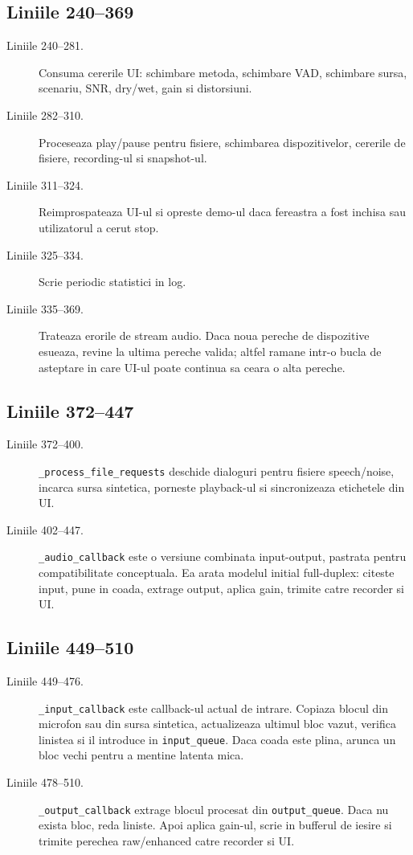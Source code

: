 \documentclass[12pt,a4paper]{report}
\newcommand{\chunk}[3]{\subsection*{Liniile #2--#3}}
\begin{document}
\chunk{../src/tools/realtime/engine.py}{240}{369}

\begin{description}
    \item[Liniile 240--281.] Consuma cererile UI: schimbare metoda, schimbare VAD,
    schimbare sursa, scenariu, SNR, dry/wet, gain si distorsiuni.
    \item[Liniile 282--310.] Proceseaza play/pause pentru fisiere, schimbarea
    dispozitivelor, cererile de fisiere, recording-ul si snapshot-ul.
    \item[Liniile 311--324.] Reimprospateaza UI-ul si opreste demo-ul daca fereastra
    a fost inchisa sau utilizatorul a cerut stop.
    \item[Liniile 325--334.] Scrie periodic statistici in log.
    \item[Liniile 335--369.] Trateaza erorile de stream audio. Daca noua pereche de
    dispozitive esueaza, revine la ultima pereche valida; altfel ramane intr-o
    bucla de asteptare in care UI-ul poate continua sa ceara o alta pereche.
\end{description}

\chunk{../src/tools/realtime/engine.py}{372}{447}

\begin{description}
    \item[Liniile 372--400.] \texttt{\_process\_file\_requests} deschide dialoguri
    pentru fisiere speech/noise, incarca sursa sintetica, porneste playback-ul si
    sincronizeaza etichetele din UI.
    \item[Liniile 402--447.] \texttt{\_audio\_callback} este o versiune combinata
    input-output, pastrata pentru compatibilitate conceptuala. Ea arata modelul
    initial full-duplex: citeste input, pune in coada, extrage output, aplica gain,
    trimite catre recorder si UI.
\end{description}

\chunk{../src/tools/realtime/engine.py}{449}{510}

\begin{description}
    \item[Liniile 449--476.] \texttt{\_input\_callback} este callback-ul actual de
    intrare. Copiaza blocul din microfon sau din sursa sintetica, actualizeaza
    ultimul bloc vazut, verifica linistea si il introduce in \texttt{input\_queue}.
    Daca coada este plina, arunca un bloc vechi pentru a mentine latenta mica.
    \item[Liniile 478--510.] \texttt{\_output\_callback} extrage blocul procesat din
    \texttt{output\_queue}. Daca nu exista bloc, reda liniste. Apoi aplica gain-ul,
    scrie in bufferul de iesire si trimite perechea raw/enhanced catre recorder si
    UI.
\end{description}
\end{document}
